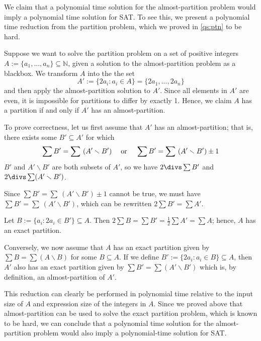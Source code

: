 \documentclass{article}
\begin{document}
\begin{solution}
We claim that a polynomial time solution for the almost-partition problem would imply a polynomial time solution for SAT. To see this, we present a polynomial time reduction from the partition problem, which we proved in \ref{qs:ptn} to be hard.

Suppose we want to solve the partition problem on a set of positive integers $A := \{ a_1, ..., a_n\} \subseteq \mathbb{N}$, given a solution to the almost-partition problem as a blackbox. We transform $A$ into the the set
\[ A' := \{ 2a_i : a_i \in A\} = \{ 2a_1, ..., 2a_n\} \]
and then apply the almost-partition solution to $A'$. Since all elements in $A'$ are even, it is impossible for partitions to differ by exactly 1. Hence, we claim  $A$ has a partition if and only if $A'$ has an almost-partition.


\vspace{1.5cc}
\begin{subproof} [Correctness]
To prove correctness, let us first assume that $A'$ has an almost-partition; that is, there exists some $B' \subseteq A'$ for which
\[\sum B' = \sum \ (A' \smallsetminus B') \hspace{1cc} \text{or} \hspace{1cc} \sum B' = \sum \ (A' \smallsetminus B') \pm 1\]
 $B'$ and $A' \smallsetminus B'$ are both subsets of $A'$, so we have $2 \divs \sum B'$ and $2 \divs \sum (A' \smallsetminus B')$.

 Since $\sum B' = \sum \ (A' \smallsetminus B') \pm 1$ cannot be true, we must have $\sum B' = \sum \ (A' \smallsetminus B')$, which can be rewritten $2 \sum B' = \sum A'$.

Let $B := \{a_i : 2a_i \in B'\} \subseteq A$. Then $2 \sum B = \sum B' = \frac{1}{2} \sum A' = \sum A$; hence, $A$ has an exact partition.

\vspace{1cc}
Conversely, we now assume that $A$ has an exact partition given by $\sum B = \sum (A \smallsetminus B)$ for some $B \subseteq A$. If we define $B' := \{2a_i : a_i \in B\} \subseteq A$, then $A'$ also has an exact partition given by $\sum B' = \sum (A' \smallsetminus B')$ which is, by definition, an almost-partition of $A'$.
\end{subproof}


This reduction can clearly be performed in polynomial time relative to the input size of $A$ and expression size of the integers in $A$. Since we proved above that almost-partition can be used to solve the exact partition problem, which is known to be hard, we can conclude that a polynomial time solution for the almost-partition problem would also imply a polynomial-time solution for SAT.
\end{solution}
\pagebreak
\end{document}
